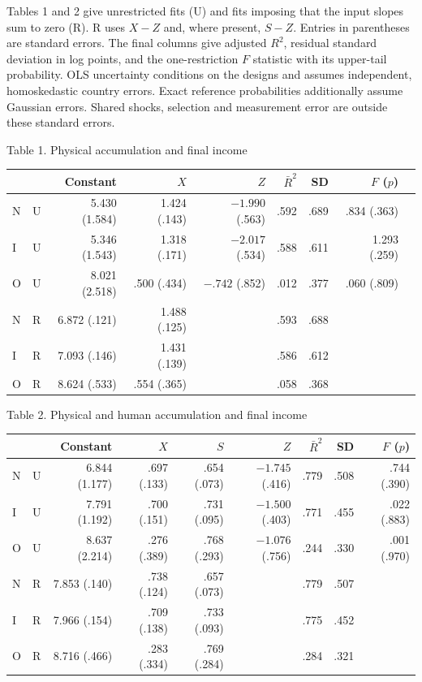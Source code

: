 \documentclass[11pt]{article}
\begin{document}
Tables 1 and 2 give unrestricted fits (U) and fits imposing that the input slopes sum to zero (R). R uses $X-Z$ and, where present, $S-Z$. Entries in parentheses are standard errors. The final columns give adjusted $R^2$, residual standard deviation in log points, and the one-restriction $F$ statistic with its upper-tail probability. OLS uncertainty conditions on the designs and assumes independent, homoskedastic country errors. Exact reference probabilities additionally assume Gaussian errors. Shared shocks, selection and measurement error are outside these standard errors.

\begin{center}\small
Table 1. Physical accumulation and final income\\[3pt]
\begin{tabular}{llrrrrrrr}\toprule
 & & Constant & $X$ & $Z$ & $\bar R^2$ & SD & $F$ ($p$)\\\midrule
N&U&5.430 (1.584)&1.424 (.143)&$-1.990$ (.563)&.592&.689&.834 (.363)\\
I&U&5.346 (1.543)&1.318 (.171)&$-2.017$ (.534)&.588&.611&1.293 (.259)\\
O&U&8.021 (2.518)&.500 (.434)&$-.742$ (.852)&.012&.377&.060 (.809)\\
N&R&6.872 (.121)&1.488 (.125)&&.593&.688&\\
I&R&7.093 (.146)&1.431 (.139)&&.586&.612&\\
O&R&8.624 (.533)&.554 (.365)&&.058&.368&\\\bottomrule
\end{tabular}

\medskip
Table 2. Physical and human accumulation and final income\\[3pt]
\setlength{\tabcolsep}{3pt}
\begin{tabular}{llrrrrrrr}\toprule
&&Constant&$X$&$S$&$Z$&$\bar R^2$&SD&$F$ ($p$)\\\midrule
N&U&6.844 (1.177)&.697 (.133)&.654 (.073)&$-1.745$ (.416)&.779&.508&.744 (.390)\\
I&U&7.791 (1.192)&.700 (.151)&.731 (.095)&$-1.500$ (.403)&.771&.455&.022 (.883)\\
O&U&8.637 (2.214)&.276 (.389)&.768 (.293)&$-1.076$ (.756)&.244&.330&.001 (.970)\\
N&R&7.853 (.140)&.738 (.124)&.657 (.073)&&.779&.507&\\
I&R&7.966 (.154)&.709 (.138)&.733 (.093)&&.775&.452&\\
O&R&8.716 (.466)&.283 (.334)&.769 (.284)&&.284&.321&\\\bottomrule
\end{tabular}\end{center}
\end{document}
